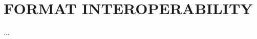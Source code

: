 \documentclass[../report.tex]{subfiles}
\begin{document}
\section{FORMAT INTEROPERABILITY}

...
\end{document}
